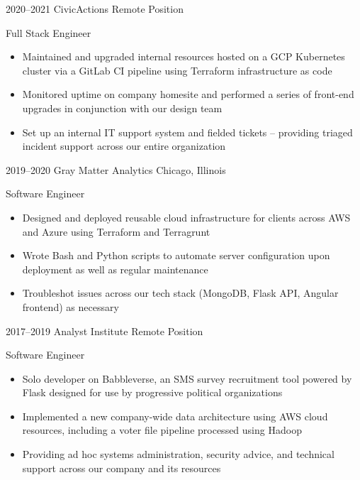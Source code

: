 \documentclass[letterpaper]{friggeri-cv} %
\begin{document}
\begin{entrylist}


\entry
{2020--2021}
{CivicActions}
{Remote Position}
{{Full Stack Engineer}
\begin{itemize}
\item Maintained and upgraded internal resources hosted on a GCP Kubernetes cluster via a GitLab CI pipeline using Terraform infrastructure as code
\item Monitored uptime on company homesite and performed a series of front-end upgrades in conjunction with our design team
\item Set up an internal IT support system and fielded tickets -- providing triaged incident support across our entire organization
\end{itemize}}


\entry
{2019--2020}
{Gray Matter Analytics}
{Chicago, Illinois}
{{Software Engineer}
\begin{itemize}
\item Designed and deployed reusable cloud infrastructure for clients across AWS and Azure using Terraform and Terragrunt
\item Wrote Bash and Python scripts to automate server configuration upon deployment as well as regular maintenance
\item Troubleshot issues across our tech stack (MongoDB, Flask API, Angular frontend) as necessary
\end{itemize}}


\entry
{2017--2019}
{Analyst Institute}
{Remote Position}
{{Software Engineer}
\begin{itemize}
\item Solo developer on Babbleverse, an SMS survey recruitment tool powered by Flask designed for use by progressive political organizations
\item Implemented a new company-wide data architecture using AWS cloud resources, including a voter file pipeline processed using Hadoop
\item Providing ad hoc systems administration, security advice, and technical support across our company and its resources
\end{itemize}}



\end{entrylist}
\end{document}
